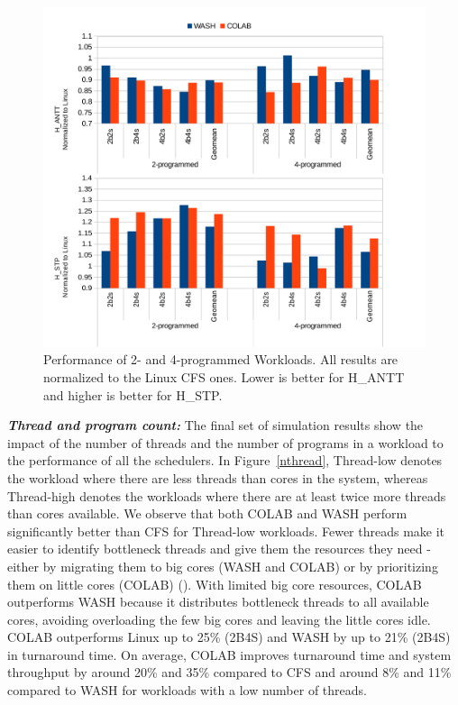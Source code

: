 \begin{figure}
\centering
\includegraphics[scale=0.55]{figures/nprog.pdf}
\caption{Performance of 2- and 4-programmed Workloads. All results are normalized to the Linux CFS ones. Lower is better for H\_ANTT and higher is better for H\_STP.}
\label{nprog}
\end{figure}
\textbf{\textit{Thread and program count:}}
The final set of simulation results show the impact of the number of threads and the number of programs in a workload to the performance of all the schedulers. In Figure~\ref{nthread}, Thread-low denotes the workload where there are less threads than cores in the system, whereas Thread-high denotes the workloads where there are at least twice more threads than cores available. We observe that both COLAB and WASH perform significantly better than CFS for Thread-low workloads. Fewer threads make it easier to identify bottleneck threads and give them the resources they need - either by migrating them to big cores (WASH and COLAB) or by prioritizing them on little cores (COLAB) (). With limited big core resources, COLAB outperforms WASH because it distributes bottleneck threads to all available cores, avoiding overloading the few big cores and leaving the little cores idle. COLAB outperforms Linux up to 25\% (2B4S) and WASH by up to 21\% (2B4S) in turnaround time. On average, COLAB improves turnaround time and system throughput by around 20\% and 35\% compared to CFS and around 8\% and 11\% compared to WASH for workloads with a low number of threads.
